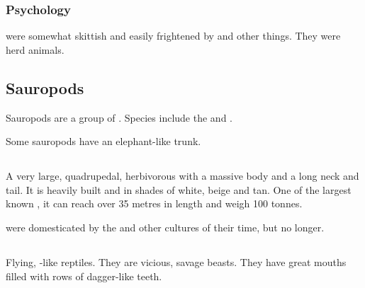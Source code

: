 \subsubsection{Psychology}
\Relcs were somewhat skittish and easily frightened by  and other things. 
They were herd animals.















\subsection{Sauropods}
Sauropods are a group of \saurians{}. 
Species include the \brukath{} and \tondra. 

Some sauropods have an elephant-like trunk. 















\subsection{\Tondra}
\index{\tondra}
A very large, quadrupedal, herbivorous  with a massive body and a long neck and tail. 
It is heavily built and \coloured in shades of white, beige and tan. 
One of the largest known \saurians{}, it can reach over 35 metres in length and weigh 100 tonnes. 

\Tondras{} were domesticated by the  and other cultures of their time, but no longer. 
















\subsection{\Vreiiden}
\index{\vreiid}
Flying, \dragon-like reptiles. They are vicious, savage beasts. They have great mouths filled with rows of dagger-like teeth. 

